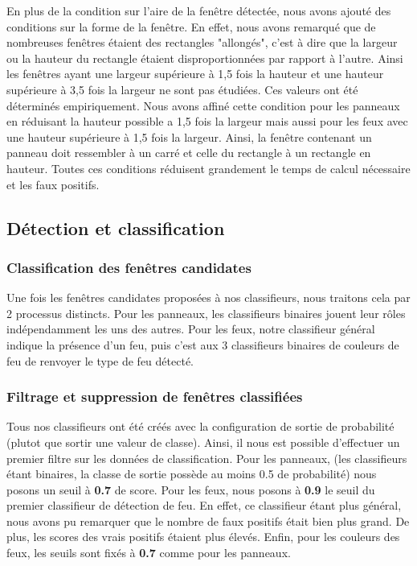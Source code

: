 \documentclass[a4paper,11pt]{article}
\begin{document}
\vspace{2mm}

\noindent En plus de la condition sur l'aire de la fenêtre détectée, nous avons ajouté des conditions sur la forme de la fenêtre. En effet, nous avons remarqué que de nombreuses fenêtres étaient des rectangles "allongés", c'est à dire que la largeur ou la hauteur du rectangle étaient disproportionnées par rapport à l'autre. Ainsi les fenêtres ayant une largeur supérieure à 1,5 fois la hauteur et une hauteur supérieure à 3,5 fois la largeur ne sont pas étudiées. Ces valeurs ont été déterminés empiriquement. Nous avons affiné cette condition pour les panneaux en réduisant la hauteur possible a 1,5 fois la largeur mais aussi pour les feux avec une hauteur supérieure à 1,5 fois la largeur. Ainsi, la fenêtre contenant un panneau doit ressembler à un carré et celle du rectangle à un rectangle en hauteur. Toutes ces conditions réduisent grandement le temps de calcul nécessaire et les faux positifs.

\subsection{Détection et classification} 

\subsubsection{Classification des fenêtres candidates}

Une fois les fenêtres candidates proposées à nos classifieurs, nous traitons cela par 2 processus distincts. Pour les panneaux, les classifieurs binaires jouent leur rôles indépendamment les uns des autres. Pour les feux, notre classifieur général indique la présence d'un feu, puis c'est aux 3 classifieurs binaires de couleurs de feu de renvoyer le type de feu détecté.

\subsubsection{Filtrage et suppression de fenêtres classifiées}
 
Tous nos classifieurs ont été créés avec la configuration de sortie de probabilité (plutot que sortir une valeur de classe). Ainsi, il nous est possible d'effectuer un premier filtre sur les données de classification. Pour les panneaux, (les classifieurs étant binaires, la classe de sortie possède au moins 0.5 de probabilité) nous posons un seuil à \textbf{0.7} de score. Pour les feux, nous posons à \textbf{0.9} le seuil du premier classifieur de détection de feu. En effet, ce classifieur étant plus général, nous avons pu remarquer que le nombre de faux positifs était bien plus grand. De plus, les scores des vrais positifs étaient plus élevés. Enfin, pour les couleurs des feux, les seuils sont fixés à \textbf{0.7} comme pour les panneaux.
\end{document}
